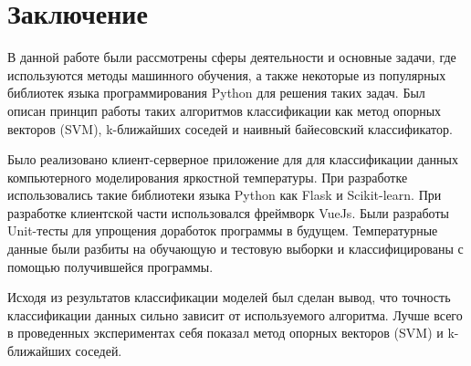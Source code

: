 \newpage
\section{Заключение}
В данной работе были рассмотрены сферы деятельности и основные задачи, где используются методы машинного обучения, а также некоторые из популярных библиотек языка программирования Python для решения таких задач. Был описан принцип работы таких алгоритмов классификации как метод опорных векторов (SVM), k-ближайших соседей и наивный байесовский классификатор.
\par
Было реализовано клиент-серверное приложение для для классификации данных компьютерного моделирования яркостной температуры. При разработке использовались такие библиотеки языка Python как Flask и Scikit-learn. При разработке клиентской части использовался фреймворк VueJs. Были разработы Unit-тесты для упрощения доработок программы в будущем. Температурные данные были разбиты на обучающую и тестовую выборки и классифицированы с помощью получившейся программы.
\par
Исходя из результатов классификации моделей был сделан вывод, что точность классификации данных сильно зависит от используемого алгоритма. Лучше всего в проведенных экспериментах себя показал метод опорных векторов (SVM) и k-ближайших соседей.